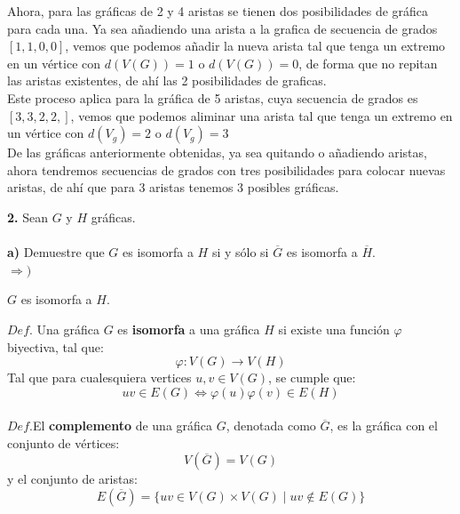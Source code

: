 \documentclass[12pt]{article}
\begin{document}
Ahora, para las gráficas de 2 y 4 aristas se tienen dos posibilidades de gráfica para cada una. Ya sea añadiendo una arista a la grafica de secuencia
de grados $[1, 1, 0, 0]$, vemos que podemos añadir la nueva arista tal que
tenga un extremo en un vértice con $d(V(G)) = 1$ o $d(V(G)) = 0$, 
de forma que no repitan las aristas existentes, de ahí las 2 posibilidades de graficas.\\

Este proceso aplica para la gráfica de 5 aristas, cuya secuencia de grados es $[3, 3, 2, 2,]$, vemos
que podemos aliminar una arista tal que tenga un extremo en un vértice con $d(V_g) = 2$ o $d(V_g) = 3$\\

De las gráficas anteriormente obtenidas, ya sea quitando o añadiendo aristas, 
ahora tendremos secuencias de grados con tres posibilidades para colocar nuevas aristas,
de ahí que para 3 aristas tenemos 3 posibles gráficas.\\
\vspace{1cm}

%
%
\textbf{2.} Sean $G$ y $H$ gráficas.
\\
\\
\textbf{a)} Demuestre que $G$ es isomorfa a $H$ si y sólo si $\overline{G}$ es isomorfa a $\overline{H}$.\\
$\Rightarrow)$
\begin{tcolorbox}[title=\textbf{Hipotesis}, colback=red!15!white, colframe=black!, breakable]
    $G$ es isomorfa a $H$.
\end{tcolorbox}
\begin{tcolorbox}[title=\textbf{Definiciones}, colback=blue!15!white, colframe=black!, breakable]
    $Def$. Una gráfica $G$ es \textbf{isomorfa} a una gráfica $H$ si existe una función $\varphi$ biyectiva, tal que:
    \[\varphi: V(G) \rightarrow V(H)\]
    Tal que para cualesquiera vertices $u,v \in V(G)$, se cumple que:
    \[uv \in E(G) \Leftrightarrow \varphi(u)\varphi(v) \in E(H)\]
    \\
    $Def$.El \textbf{complemento} de una gráfica $G$, denotada como $\overline{G}$, es la gráfica con el conjunto de vértices:
    \[V(\overline{G}) = V(G)\]
    y el conjunto de aristas:
    \[E(\overline{G}) = \{ uv \in V(G) \times V(G) \mid uv \notin E(G)\}\]
\end{tcolorbox}
\end{document}
